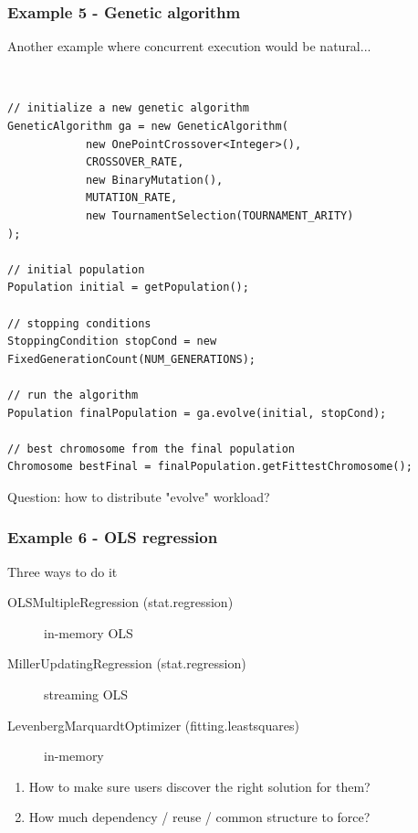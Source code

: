 \documentclass[14pt,mathserif]{beamer}
\begin{document}
\begin{frame}[fragile]
  \frametitle{Example 5 - Genetic algorithm}

\begin{small}
Another example where concurrent execution would be natural...
\end{small}
\\
\begin{verbatim}
// initialize a new genetic algorithm
GeneticAlgorithm ga = new GeneticAlgorithm(
            new OnePointCrossover<Integer>(),
            CROSSOVER_RATE, 
            new BinaryMutation(),
            MUTATION_RATE,
            new TournamentSelection(TOURNAMENT_ARITY)
);

// initial population 
Population initial = getPopulation(); 

// stopping conditions
StoppingCondition stopCond = new FixedGenerationCount(NUM_GENERATIONS);

// run the algorithm
Population finalPopulation = ga.evolve(initial, stopCond);

// best chromosome from the final population
Chromosome bestFinal = finalPopulation.getFittestChromosome();

\end{verbatim}
 
\begin{small}
Question: how to distribute "evolve" workload?
\end{small}
\end{frame}

\begin{frame}[fragile]
  \frametitle{Example 6 - OLS regression}

\begin{small}
Three ways to do it
\begin{description}
  \item[OLSMultipleRegression (stat.regression)] in-memory OLS
  \item[MillerUpdatingRegression (stat.regression)] streaming OLS
  \item[LevenbergMarquardtOptimizer (fitting.leastsquares)] in-memory
\end{description}
\begin{enumerate}
\item How to make sure users discover the right solution for them?
\item How much dependency / reuse / common structure to force?
\end{enumerate}
\end{small}
\end{frame}
\end{document}

